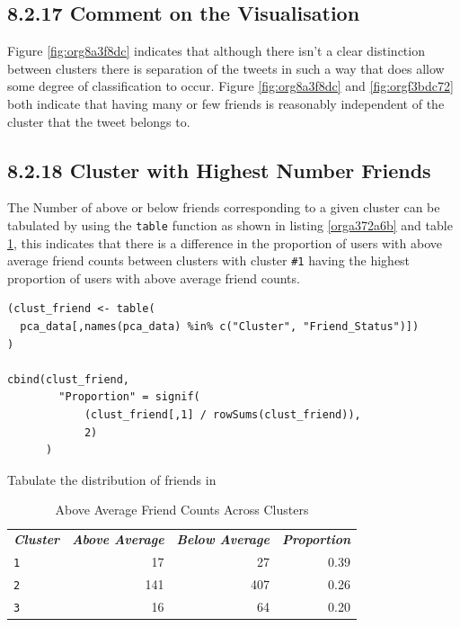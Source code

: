 \documentclass[11pt]{article}
\begin{document}
\subsection{8.2.17 Comment on the Visualisation}
\label{sec:org7388c25}
Figure \ref{fig:org8a3f8dc} indicates that although there isn't a clear distinction between
clusters there is separation of the tweets in such a way that does allow some
degree of classification to occur. Figure \ref{fig:org8a3f8dc} and \ref{fig:orgf3bdc72} both indicate that having
many or few friends is reasonably independent of the cluster that the tweet
belongs to.
\subsection{8.2.18 Cluster with Highest Number Friends}
\label{sec:org30a205c}
The Number of above or below friends corresponding to a given cluster can be tabulated by using the \texttt{table} function as shown in listing \ref{orga372a6b} and table \ref{tab:orgc5d8f30}, this indicates that there is a difference in the proportion of users with above average friend counts between clusters with cluster \texttt{\#1} having the highest proportion of users with above average friend counts.

\begin{listing}[htbp]
\begin{verbatim}
(clust_friend <- table(
  pca_data[,names(pca_data) %in% c("Cluster", "Friend_Status")])
)

cbind(clust_friend,
        "Proportion" = signif(
            (clust_friend[,1] / rowSums(clust_friend)),
            2)
      )
\end{verbatim}
\caption{\label{orga372a6b}Tabulate the distribution of friends in}
\end{listing}

\begin{table}[htbp]
\caption{\label{tab:orgc5d8f30}Above Average Friend Counts Across Clusters}
\centering
\begin{tabular}{lrrr}
\textbf{\emph{Cluster}} & \textbf{\emph{Above Average}} & \textbf{\emph{Below Average}} & \textbf{\emph{Proportion}}\\
\texttt{1} & 17 & 27 & 0.39\\
\texttt{2} & 141 & 407 & 0.26\\
\texttt{3} & 16 & 64 & 0.20\\
\end{tabular}
\end{table}
\end{document}
